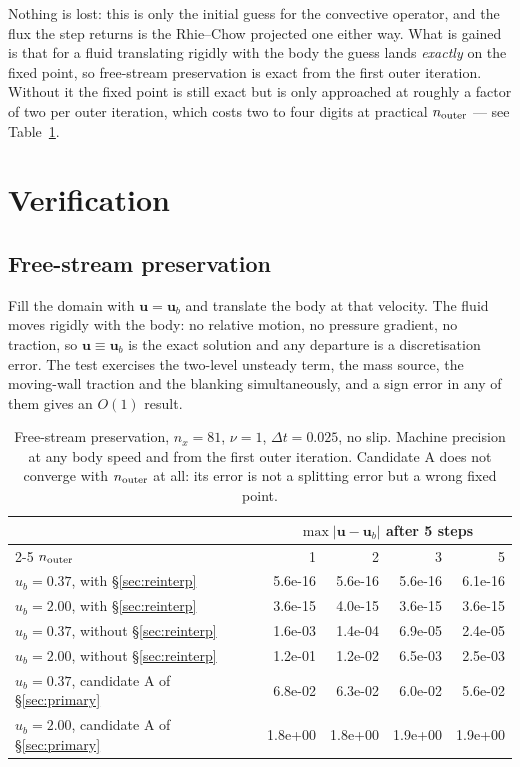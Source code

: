 \documentclass[11pt,a4paper]{article}
\theoremstyle{remark}
\newcommand{\uu}{\bm{u}}
\newcommand{\ub}{\uu_b}
\newcommand{\dt}{\Delta t}
\begin{document}
Nothing is lost: this is only the initial guess for the convective operator, and the flux the
step returns is the Rhie--Chow projected one either way. What is gained is that for a fluid
translating rigidly with the body the guess lands \emph{exactly} on the fixed point, so
free-stream preservation is exact from the first outer iteration. Without it the fixed point is
still exact but is only approached at roughly a factor of two per outer iteration, which costs
two to four digits at practical $n_{\rm outer}$ --- see Table~\ref{tab:freestream}.

\section{Verification}

\subsection{Free-stream preservation}

Fill the domain with $\uu=\ub$ and translate the body at that velocity. The fluid moves rigidly
with the body: no relative motion, no pressure gradient, no traction, so $\uu\equiv\ub$ is the
exact solution and any departure is a discretisation error. The test exercises the two-level
unsteady term, the mass source, the moving-wall traction and the blanking simultaneously, and a
sign error in any of them gives an $O(1)$ result.

\begin{table}[h]
\centering\small
\begin{tabular}{@{}lrrrr@{}}
\toprule
& \multicolumn{4}{c}{$\max|\uu-\ub|$ after 5 steps} \\
\cmidrule(l){2-5}
$n_{\rm outer}$ & 1 & 2 & 3 & 5\\
\midrule
$u_b=0.37$, with \S\ref{sec:reinterp}    & 5.6e-16 & 5.6e-16 & 5.6e-16 & 6.1e-16\\
$u_b=2.00$, with \S\ref{sec:reinterp}    & 3.6e-15 & 4.0e-15 & 3.6e-15 & 3.6e-15\\
\midrule
$u_b=0.37$, without \S\ref{sec:reinterp} & 1.6e-03 & 1.4e-04 & 6.9e-05 & 2.4e-05\\
$u_b=2.00$, without \S\ref{sec:reinterp} & 1.2e-01 & 1.2e-02 & 6.5e-03 & 2.5e-03\\
\midrule
$u_b=0.37$, candidate A of \S\ref{sec:primary} & 6.8e-02 & 6.3e-02 & 6.0e-02 & 5.6e-02\\
$u_b=2.00$, candidate A of \S\ref{sec:primary} & 1.8e+00 & 1.8e+00 & 1.9e+00 & 1.9e+00\\
\bottomrule
\end{tabular}
\caption{Free-stream preservation, $n_x=81$, $\nu=1$, $\dt=0.025$, no slip. Machine precision at
any body speed and from the first outer iteration. Candidate A does not converge with
$n_{\rm outer}$ at all: its error is not a splitting error but a wrong fixed point.}
\label{tab:freestream}
\end{table}
\end{document}
